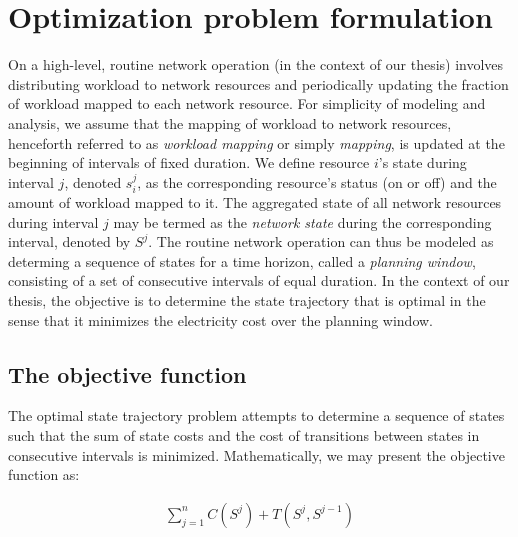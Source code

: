 \section{Optimization problem formulation}
\label{sec:framework:optimization}
On a high-level, routine network operation (in the context of our thesis) involves distributing workload to network resources and periodically updating the fraction of workload mapped to each network resource. For simplicity of modeling and analysis, we assume that the mapping of workload to network resources, henceforth referred to as \textit{workload mapping} or simply \textit{mapping}, is updated at the beginning of intervals of fixed duration. We define resource $i$'s state during interval $j$, denoted $s_i^j$, as the corresponding resource's status (on or off) and the amount of workload mapped to it. The aggregated state of all network resources during interval $j$ may be termed as the \textit{network state} during the corresponding interval, denoted by $S^j$. The routine network operation can thus be modeled as determing a sequence of states for a time horizon, called a \textit{planning window}, consisting of a set of consecutive intervals of equal duration. In the context of our thesis, the objective is to determine the state trajectory that is optimal in the sense that it minimizes the electricity cost over the planning window. %

\subsection{The objective function}
\label{subsec:framework:objective} %
The optimal state trajectory problem attempts to determine a sequence of states such that the sum of state costs and the cost of transitions between states in consecutive intervals is minimized. Mathematically, we may present the objective function as:

\begin{align}
\sum_{j=1}^n C(S^j) + T(S^j, S^{j-1})
\end{align}

